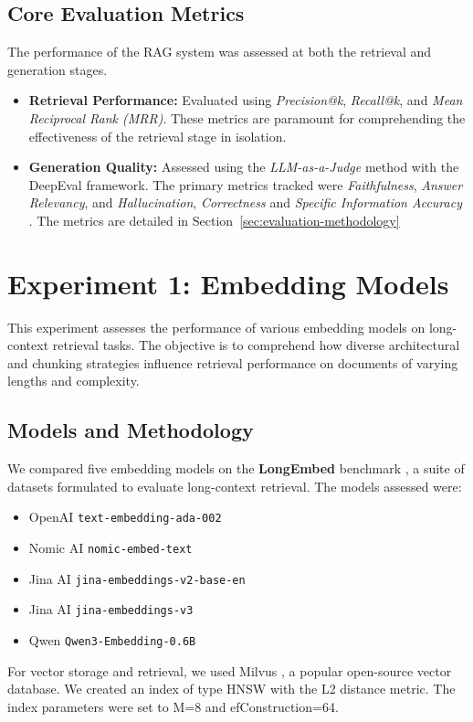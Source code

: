 \subsection{Core Evaluation Metrics}
The performance of the RAG system was assessed at both the retrieval and generation stages.
\begin{itemize}
\item \textbf{Retrieval Performance:} Evaluated using \textit{Precision@k}, \textit{Recall@k}, and \textit{Mean Reciprocal Rank (MRR)}. These metrics are paramount for comprehending the effectiveness of the retrieval stage in isolation.
\item \textbf{Generation Quality:} Assessed using the \textit{LLM-as-a-Judge} method with the DeepEval framework. The primary metrics tracked were \textit{Faithfulness}, \textit{Answer Relevancy}, and \textit{Hallucination}, \textit{Correctness} and \textit{Specific Information Accuracy} \autocite{zheng2023judgingllmasajudgemtbenchchatbot}. The metrics are detailed in Section~\ref{sec:evaluation-methodology}
\end{itemize}

\section{Experiment 1: Embedding Models}
\label{sec:exp_embedding_models}
This experiment assesses the performance of various embedding models on long-context retrieval tasks. The objective is to comprehend how diverse architectural and chunking strategies influence retrieval performance on documents of varying lengths and complexity.

\subsection{Models and Methodology}
We compared five embedding models on the \textbf{LongEmbed} benchmark \autocite{zhu2024longembedextendingembeddingmodels}, a suite of datasets formulated to evaluate long-context retrieval. The models assessed were:
\begin{itemize}
    \item OpenAI \texttt{text-embedding-ada-002}
    \item Nomic AI \texttt{nomic-embed-text}
    \item Jina AI \texttt{jina-embeddings-v2-base-en}
    \item Jina AI \texttt{jina-embeddings-v3}
    \item Qwen \texttt{Qwen3-Embedding-0.6B}
\end{itemize}
For vector storage and retrieval, we used Milvus \autocite{milvus}, a popular open-source vector database. We created an index of type HNSW with the L2 distance metric. The index parameters were set to M=8 and efConstruction=64.


